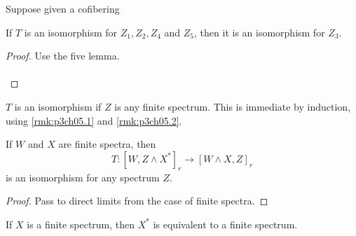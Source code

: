 \documentclass[../main]{subfiles}
\begin{document}
\begin{remark}
\label{rmk:p3ch05.2}
Suppose given a cofibering 
\begin{center}
\end{center}
If $T$ is an isomorphism for $Z_1,Z_2,Z_4$ and $Z_5$, then it is an isomorphism for $Z_3$.
\end{remark}
\begin{proof}
Use the five lemma.\paragraph{ \newline}
\end{proof}

\begin{remark}
\label{rmk:p3ch05.3}
$T$ is an isomorphism if $Z$ is any finite spectrum. This is immediate by induction, using \ref{rmk:p3ch05.1} and \ref{rmk:p3ch05.2}.
\end{remark}

\begin{proposition}
If $W$ and $X$ are finite spectra, then $$T\colon[W,Z\wedge X^{\ast}]_r\longrightarrow[W\wedge X,Z]_r$$is an isomorphism for any spectrum $Z$.
\end{proposition}
\begin{proof}
Pass to direct limits from the case of finite spectra.
\end{proof}


\begin{lemma}
\label{lem:p3ch05.5}
If $X$ is a finite spectrum, then $X^{\ast}$ is equivalent to a finite spectrum.
\end{lemma}
\end{document}
